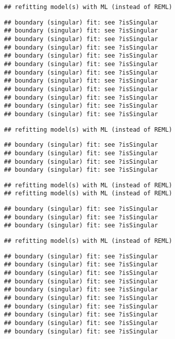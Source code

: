 \documentclass[
]{article}
\begin{document}
\begin{verbatim}
## refitting model(s) with ML (instead of REML)
\end{verbatim}

\begin{verbatim}
## boundary (singular) fit: see ?isSingular
## boundary (singular) fit: see ?isSingular
## boundary (singular) fit: see ?isSingular
## boundary (singular) fit: see ?isSingular
## boundary (singular) fit: see ?isSingular
## boundary (singular) fit: see ?isSingular
## boundary (singular) fit: see ?isSingular
## boundary (singular) fit: see ?isSingular
## boundary (singular) fit: see ?isSingular
## boundary (singular) fit: see ?isSingular
## boundary (singular) fit: see ?isSingular
## boundary (singular) fit: see ?isSingular
\end{verbatim}

\begin{verbatim}
## refitting model(s) with ML (instead of REML)
\end{verbatim}

\begin{verbatim}
## boundary (singular) fit: see ?isSingular
## boundary (singular) fit: see ?isSingular
## boundary (singular) fit: see ?isSingular
## boundary (singular) fit: see ?isSingular
\end{verbatim}

\begin{verbatim}
## refitting model(s) with ML (instead of REML)
## refitting model(s) with ML (instead of REML)
\end{verbatim}

\begin{verbatim}
## boundary (singular) fit: see ?isSingular
## boundary (singular) fit: see ?isSingular
## boundary (singular) fit: see ?isSingular
\end{verbatim}

\begin{verbatim}
## refitting model(s) with ML (instead of REML)
\end{verbatim}

\begin{verbatim}
## boundary (singular) fit: see ?isSingular
## boundary (singular) fit: see ?isSingular
## boundary (singular) fit: see ?isSingular
## boundary (singular) fit: see ?isSingular
## boundary (singular) fit: see ?isSingular
## boundary (singular) fit: see ?isSingular
## boundary (singular) fit: see ?isSingular
## boundary (singular) fit: see ?isSingular
## boundary (singular) fit: see ?isSingular
## boundary (singular) fit: see ?isSingular
\end{verbatim}
\end{document}
